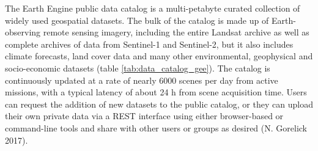 	The Earth Engine public data catalog is a multi-petabyte curated collection of widely used geospatial datasets. The bulk of the catalog is made up of Earth-observing remote sensing imagery, including the entire Landsat archive as well as complete archives of data from Sentinel-1 and Sentinel-2, but it also includes climate forecasts, land cover data and many other environmental, geophysical and socio-economic datasets (table \ref{tab:data_catalog_gee}). The catalog is continuously updated at a rate of nearly 6000 scenes per day from active missions, with a typical latency of about 24 h from scene acquisition time. Users can request the addition of new datasets to the public catalog, or they can upload their own private data via a REST interface using either browser-based or command-line tools and share with other users or groups as desired (N. Gorelick 2017).
	
